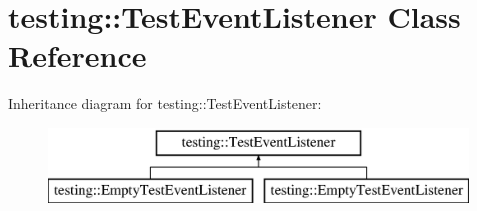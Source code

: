 \hypertarget{classtesting_1_1_test_event_listener}{}\section{testing\+:\+:Test\+Event\+Listener Class Reference}
\label{classtesting_1_1_test_event_listener}
Inheritance diagram for testing\+:\+:Test\+Event\+Listener\+:\begin{figure}[H]
\begin{center}
\leavevmode
\includegraphics[height=2.000000cm]{classtesting_1_1_test_event_listener}
\end{center}
\end{figure}
